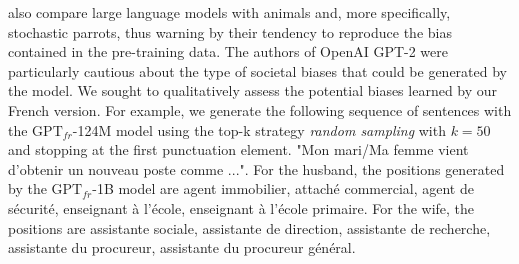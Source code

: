 \textcite{bender_21} also compare large language models with animals and, more specifically, stochastic parrots, thus warning by their tendency to reproduce the bias contained in the pre-training data. The authors of OpenAI GPT-2 were particularly cautious about the type of societal biases that could be generated by the model. We sought to qualitatively assess the potential biases learned by our French version. For example, we generate the following sequence of sentences with the $\text{GPT}_{fr}$-124M model using the top-k strategy \textit{random sampling} \parencite{lewis_18} with $k=50$ and stopping at the first punctuation element. "Mon mari/Ma femme vient d'obtenir un nouveau poste comme ...". For the husband, the positions generated by the $\text{GPT}_{fr}$-1B model are agent immobilier, attaché commercial, agent de sécurité, enseignant à l'école, enseignant à l'école primaire. For the wife, the positions are assistante sociale, assistante de direction, assistante de recherche, assistante du procureur, assistante du procureur général.



